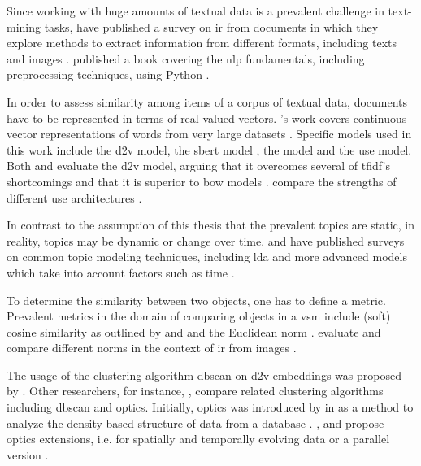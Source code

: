 Since working with huge amounts of textual data is a prevalent challenge in text-mining tasks,
\citeauthor{InformationRetrieval1999} have published a survey on \ac{ir} from documents in which
they explore methods to extract information from different formats, including texts and images \cite{InformationRetrieval1999}.
\citeauthor{nlp-book2009} published a book covering the \ac{nlp} fundamentals, including preprocessing techniques, using Python \cite{nlp-book2009}.

In order to assess similarity among items of a corpus of textual data, documents have to be represented in terms of real-valued vectors.
\citeauthor{WordRep2013}'s work covers continuous vector representations of words from very large datasets \cite{WordRep2013}.
Specific models used in this work include 
the \ac{d2v} model, the \ac{sbert} model \cite{HfsentTrans2019}, the \infersent{} model \cite{inferSent2018} and the \ac{use} model.
Both \citeauthor{clusteringDocs2020} and \citeauthor{SentRep2014} evaluate the \ac{d2v} model, 
arguing that it overcomes several of \ac{tfidf}'s shortcomings \cite{clusteringDocs2020} and that it is superior to \ac{bow} models \cite{SentRep2014}.
\citeauthor{UniversalSentEnc2018} compare the strengths of different \ac{use} architectures \cite{UniversalSentEnc2018}.

In contrast to the assumption of this thesis that the prevalent topics are static, in reality, topics may be dynamic or change over time.
\citeauthor{topic_modeling2015} and \citeauthor{topic_modeling2020} have published surveys on common topic modeling techniques, 
including \ac{lda} and more advanced models which take into account factors such as time \cite{topic_modeling2015, topic_modeling2020}.

To determine the similarity between two objects, one has to define a metric.
Prevalent metrics in the domain of comparing objects in a \ac{vsm} include (soft) cosine similarity 
as outlined by \citeauthor{soft_cosine2014} and \citeauthor{soft_cosine2017} \cite{soft_cosine2014, soft_cosine2017}
and the Euclidean norm \cite{euclidean_l2_norm2015}.
\citeauthor{euclidean_l2_norm2015} evaluate and compare different norms in the context of \ac{ir} from images \cite{euclidean_l2_norm2015}.


The usage of the clustering algorithm \ac{dbscan} on \ac{d2v} embeddings was proposed by \citeauthor{clusteringDocs2020} \cite{clusteringDocs2020}.
Other researchers, for instance, \citeauthor{OPTICS_kMeans_2016}, compare related clustering algorithms including \ac{dbscan} and \ac{optics}.
Initially, \ac{optics} was introduced by \citeauthor{OPTICS1999} in \citeyear{OPTICS1999} as a method to analyze the density-based structure of data from a database \cite{OPTICS1999}.
\citeauthor{OPTICS2013}, \citeauthor{OPTICS2014} and \citeauthor{OPTICS2016} propose \ac{optics} extensions, 
i.e. for spatially and temporally evolving data or a parallel version \cite{OPTICS2013, OPTICS2014, OPTICS2016}.


